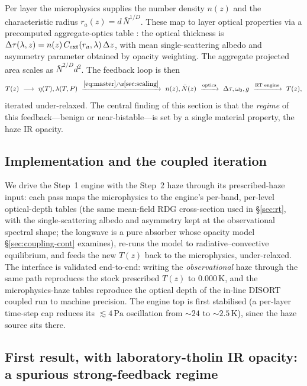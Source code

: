 \documentclass[11pt]{article}
\newcommand{\Nbar}{\bar{N}}
\newcommand{\Df}{D}
\begin{document}
Per layer the microphysics supplies the number density $n(z)$ and the
characteristic radius $r_a(z)=d\,\Nbar^{1/\Df}$. These map to layer optical
properties via a precomputed aggregate-optics table
\citep[Eqs.~16--18]{deTrenquelleon2025}: the optical thickness is
$\Delta\tau(\lambda,z)=n(z)\,C_{\rm ext}(r_a,\lambda)\,\Delta z$, with mean
single-scattering albedo and asymmetry parameter obtained by opacity weighting.
The aggregate projected area scales as $\Nbar^{2/\Df}d^2$. The feedback loop is
then
\[
  T(z)\ \longrightarrow\ \eta(T),\lambda(T,P)
  \ \xrightarrow{\eqref{eq:master}/\S\ref{sec:scaling}}\ n(z),\Nbar(z)
  \ \xrightarrow{\text{optics}}\ \Delta\tau,\omega_0,g
  \ \xrightarrow{\text{RT engine}}\ T(z),
\]
iterated under-relaxed. The central finding of this section is that the
\emph{regime} of this feedback---benign or near-bistable---is set by a single
material property, the haze IR opacity.

\subsection{Implementation and the coupled iteration}
\label{sec:coupling-impl}

We drive the Step~1 engine with the Step~2 haze through its prescribed-haze
input: each pass maps the microphysics to the engine's per-band, per-level
optical-depth tables (the same mean-field RDG cross-section used in
\S\ref{sec:rt}, with the single-scattering albedo and asymmetry kept at the
observational spectral shape; the longwave is a pure absorber whose opacity
model \S\ref{sec:coupling-cont} examines), re-runs the model
to radiative--convective equilibrium, and feeds the new $T(z)$ back to the
microphysics, under-relaxed. The interface is validated end-to-end: writing the
\emph{observational} haze through the same path reproduces the stock prescribed
$T(z)$ to $0.000\,\mathrm{K}$, and the microphysics-haze tables reproduce the
optical depth of the in-line DISORT coupled run to machine precision. The engine
top is first stabilised (a per-layer time-step cap reduces its
$\lesssim\!4\,\mathrm{Pa}$ oscillation from $\sim\!24$ to $\sim\!2.5\,\mathrm{K}$),
since the haze source sits there.

\subsection{First result, with laboratory-tholin IR opacity: a spurious
strong-feedback regime}
\label{sec:coupling-result}
\end{document}
